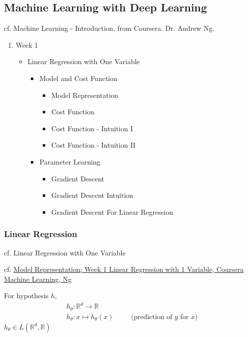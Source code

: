 \documentclass[10pt]{amsart}
\begin{document}
\begin{multicols*}{2}
\part{Machine Learning with Deep Learning}

cf. Machine Learning - Introduction, from Coursera.  Dr. Andrew Ng.

\begin{enumerate}
\item Week 1
  \begin{itemize}
  \item Linear Regression with One Variable
    \begin{itemize}
    \item Model and Cost Function
      \begin{itemize}
      \item Model Representation
      \item Cost Function
      \item Cost Function - Intuition I
      \item Cost Function - Intuition II
      \end{itemize}
    \item Parameter Learning
      \begin{itemize}
      \item Gradient Descent
      \item Gradient Descent Intuition
        \item Gradient Descent For Linear Regression
        \end{itemize}
      \end{itemize}
    \end{itemize}
  \end{enumerate}

\section{Linear Regression}

cf. Linear Regression with One Variable

cf. \href{https://www.coursera.org/learn/machine-learning/lecture/db3jS/model-representation}{Model Representation; Week 1 Linear Regression with 1 Variable, Coursera Machine Learning, Ng}

For hypothesis $h$,
\[
\begin{aligned}
  & h_{\theta} : \mathbb{R}^d \to \mathbb{R} \\ 
  & h_{\theta} : x \mapsto   h_{\theta}(x)  \qquad \, \text{ (prediction of $y$ for $x$)}
  \end{aligned}
\]
$h_{\theta} \in L(\mathbb{R}^d, \mathbb{R})$


\end{multicols*}
\end{document}
